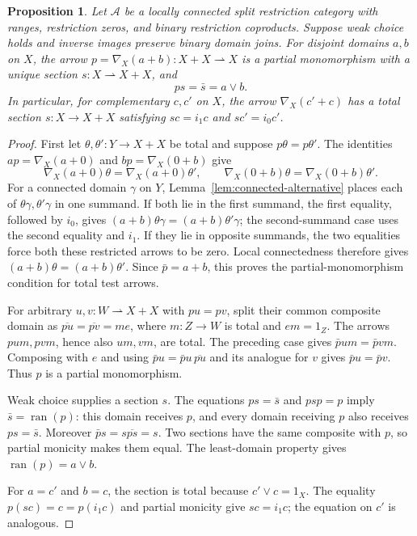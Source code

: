 \documentclass[11pt]{article}
\newtheorem{proposition}[theorem]{Proposition}
\newcommand{\ran}{\operatorname{ran}}
\begin{document}
\begin{proposition}\label{prop:local-switch}
Let $\mathcal A$ be a locally connected split restriction category with
ranges, restriction zeros, and binary restriction coproducts. Suppose
weak choice holds and inverse images preserve binary domain joins.
For disjoint domains $a,b$ on $X$, the arrow
$p=\nabla_X(a+b):X+X\rightharpoonup X$ is a partial monomorphism
with a unique section $s:X\rightharpoonup X+X$, and
\[
 ps=\bar s=a\vee b.
\]
In particular, for complementary $c,c'$ on $X$, the arrow
$\nabla_X(c'+c)$ has a total section $s:X\to X+X$ satisfying
$sc=i_1c$ and $sc'=i_0c'$.
\end{proposition}
\begin{proof}
First let $\theta,\theta':Y\to X+X$ be total and suppose
$p\theta=p\theta'$. The identities
$ap=\nabla_X(a+0)$ and $bp=\nabla_X(0+b)$ give
\[
 \nabla_X(a+0)\theta=\nabla_X(a+0)\theta',
 \qquad
 \nabla_X(0+b)\theta=\nabla_X(0+b)\theta'.
\]
For a connected domain $\gamma$ on $Y$,
Lemma~\ref{lem:connected-alternative} places each of
$\theta\gamma,\theta'\gamma$ in one summand.
If both lie in the first summand, the first equality, followed by $i_0$,
gives $(a+b)\theta\gamma=(a+b)\theta'\gamma$; the second-summand
case uses the second equality and $i_1$.
If they lie in opposite summands, the two equalities force both these
restricted arrows to be zero. Local connectedness therefore gives
$(a+b)\theta=(a+b)\theta'$. Since $\bar p=a+b$, this proves the
partial-monomorphism condition for total test arrows.

For arbitrary $u,v:W\rightharpoonup X+X$ with $pu=pv$, split their
common composite domain as
$\overline{pu}=\overline{pv}=me$, where $m:Z\to W$ is total and
$em=1_Z$. The arrows $pum,pvm$, hence also $um,vm$, are total.
The preceding case gives $\bar p um=\bar p vm$. Composing with $e$
and using $\bar p u=\bar p u\,\overline{pu}$ and its analogue for $v$
gives $\bar p u=\bar p v$. Thus $p$ is a partial monomorphism.

Weak choice supplies a section $s$. The equations $ps=\bar s$ and
$psp=p$ imply $\bar s=\ran(p)$: this domain receives $p$, and every
domain receiving $p$ also receives $ps=\bar s$. Moreover
$\bar p s=s\overline{ps}=s$. Two sections have the same composite
with $p$, so partial monicity makes them equal.
The least-domain property gives $\ran(p)=a\vee b$.

For $a=c'$ and $b=c$, the section is total because $c'\vee c=1_X$.
The equality $p(sc)=c=p(i_1c)$ and partial monicity give $sc=i_1c$;
the equation on $c'$ is analogous.
\end{proof}
\end{document}
